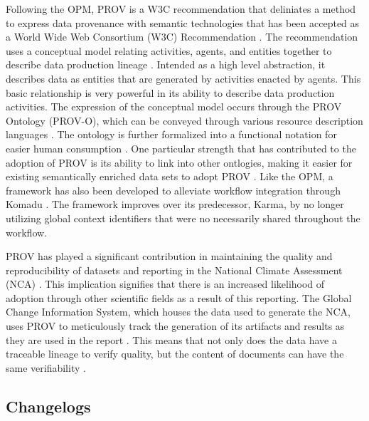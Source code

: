 Following the OPM, PROV is a W3C recommendation that deliniates a method to express data provenance with semantic technologies that has been accepted as a World Wide Web Consortium (W3C) Recommendation \cite{Belhajjame2013} \cite{Belhajjame2013c} \cite{Groth2013}.
The recommendation uses a conceptual model relating activities, agents, and entities together to describe data production lineage \cite{Belhajjame2013a} \cite{Nies2013} \cite{Missier2013}.
Intended as a high level abstraction, it describes data as entities that are generated by activities enacted by agents.
This basic relationship is very powerful in its ability to describe data production activities.
The expression of the conceptual model occurs through the PROV Ontology (PROV-O), which can be conveyed through various resource description languages \cite{Belhajjame2013b} \cite{Moreau2013a} \cite{Moreau2013b}.
The ontology is further formalized into a functional notation for easier human consumption \cite{Cheney2013} \cite{Cheney2013a}.
One particular strength that has contributed to the adoption of PROV is its ability to link into other ontlogies, making it easier for existing semantically enriched data sets to adopt PROV \cite{Miles2013} \cite{Moreau2013}.
Like the OPM, a framework has also been developed to alleviate workflow integration through Komadu \cite{Suriarachchi_2015}.
The framework improves over its predecessor, Karma, by no longer utilizing global context identifiers that were no necessarily shared throughout the workflow.

PROV has played a significant contribution in maintaining the quality and reproducibility of datasets and reporting in the National Climate Assessment (NCA) \cite{Ma2014191,}.
This implication signifies that there is an increased likelihood of adoption through other scientific fields as a result of this reporting.
The Global Change Information System, which houses the data used to generate the NCA, uses PROV to meticulously track the generation of its artifacts and results as they are used in the report \cite{Tilmes2012}.
This means that not only does the data have a traceable lineage to verify quality, but the content of documents can have the same verifiability \cite{Ma2014}. 

\subsection{Changelogs}

